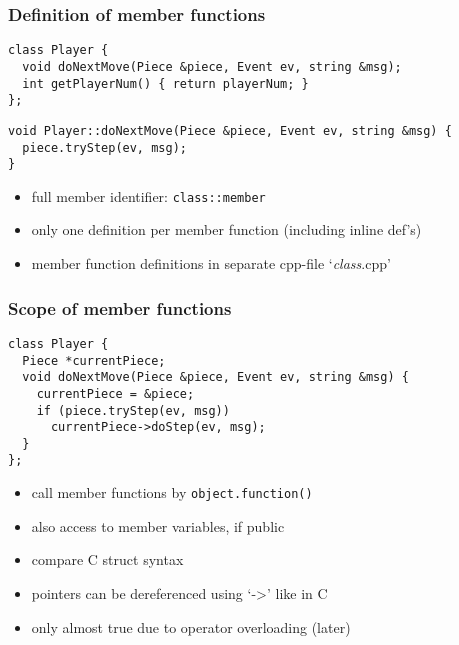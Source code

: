 \documentclass{slides}
\begin{document}
\begin{frame}
  \frametitle{Definition of member functions}

\begin{lstlisting}[title={\footnotesize\bfseries Player.hpp}]
class Player {
  void doNextMove(Piece &piece, Event ev, string &msg);
  int getPlayerNum() { return playerNum; }
};
\end{lstlisting}

\begin{lstlisting}[title={\footnotesize\bfseries Player.cpp}]
void Player::doNextMove(Piece &piece, Event ev, string &msg) {
  piece.tryStep(ev, msg);
}
\end{lstlisting}

    \begin{itemize}
    \item full member identifier: \lstinline[style=inline,deletekeywords={class}]!class::member!
    \item only one definition per member function (including inline def's)
    \item member function definitions in separate cpp-file `\textit{class}.cpp'
    \end{itemize}
\end{frame}

\begin{frame}
  \frametitle{Scope of member functions}

\begin{lstlisting}
class Player {
  Piece *currentPiece;
  void doNextMove(Piece &piece, Event ev, string &msg) {
    currentPiece = &piece;
    if (piece.tryStep(ev, msg))
      currentPiece->doStep(ev, msg);
  }
};
\end{lstlisting}

  \begin{itemize}
  \item call member functions by \lstinline[style=inline]!object.function()!
  \item also access to member variables, if public
  \item compare C struct syntax
  \item pointers can be dereferenced using `->' like in C
  \item only almost true due to operator overloading (later)
  \end{itemize}
\end{frame}
\end{document}
